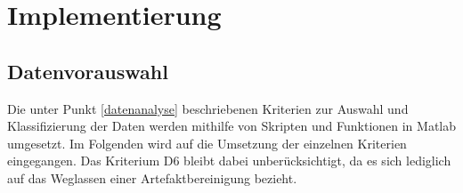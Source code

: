 \chapter{Implementierung}\label{Implementierung}

\section{Datenvorauswahl}\label{Datenvorauswahl}

Die unter Punkt \ref{datenanalyse} beschriebenen Kriterien zur Auswahl und Klassifizierung der Daten werden mithilfe von Skripten und Funktionen in Matlab umgesetzt. Im Folgenden wird auf die Umsetzung der einzelnen Kriterien eingegangen. Das Kriterium D6 bleibt dabei unberücksichtigt, da es sich lediglich auf das Weglassen einer Artefaktbereinigung bezieht.

